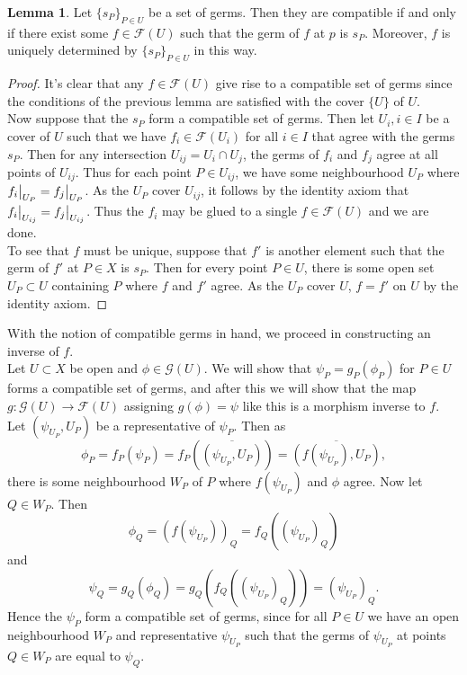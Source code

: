 \documentclass{article}
\newcommand\restr[2]{{%
  \left.\kern-\nulldelimiterspace %
  #1 %
  \vphantom{\big|} %
  \right|_{#2} %
  }}
\theoremstyle{definition}
\newtheorem{lemma}[theorem]{Lemma}
\begin{document}
\begin{lemma}
	Let $\{s_P\}_{P \in U}$ be a set of germs. Then they are compatible if and
	only if there exist some $f \in \mathcal{F}(U)$ such that the germ of $f$
	at $p$ is $s_P$. Moreover, $f$ is uniquely determined by $\{s_P\}_{P \in
	U}$ in this way.
\end{lemma}
\begin{proof}
	It's clear that any $f \in \mathcal{F}(U)$ give rise to a compatible set of
	germs since the conditions of the previous lemma are satisfied with the
	cover $\{U\}$ of $U$. \\

	Now suppose that the $s_P$ form a compatible set of germs. Then let $U_i, i
	\in I$ be a cover of $U$ such that we have $f_i \in \mathcal{F}(U_i)$ for
	all $i \in I$ that agree with the germs $s_P$. Then for any intersection
	$U_{ij} = U_i \cap U_j$, the germs of $f_i$ and $f_j$ agree at all points
	of $U_{ij}$. Thus for each point $P \in U_{ij}$, we have some neighbourhood
	$U_{P}$ where $\restr{f_i}{U_P} = \restr{f_j}{U_P}$. As the $U_P$ cover
	$U_{ij}$, it follows by the identity axiom that $\restr{f_i}{U_{ij}} =
	\restr{f_j}{U_{ij}}$. Thus the $f_i$ may be glued to a single $f \in
	\mathcal{F}(U)$ and we are done. \\

	To see that $f$ must be unique, suppose that $f'$ is another element such
	that the germ of $f'$ at $P \in X$ is $s_P$. Then for every point $P \in
	U$, there is some open set $U_P \subset U$ containing $P$ where $f$ and
	$f'$ agree. As the $U_P$ cover $U$, $f = f'$ on $U$ by the identity axiom.
\end{proof}

With the notion of compatible germs in hand, we proceed in constructing an
inverse of $f$. \\

Let $U \subset X$ be open and $\phi \in \mathcal{G}(U)$. We will show that
$\psi_P = g_P(\phi_P)$ for $P \in U$ forms a compatible set of germs, and after
this we will show that the map $g : \mathcal{G}(U) \to \mathcal{F}(U)$
assigning $g(\phi) = \psi$ like this is a morphism inverse to $f$. \\

Let $(\psi_{U_P}, U_P)$ be a representative of $\psi_P$. Then 
as
\[
	\phi_P 
	= 
	f_P(\psi_P) 
	= 
	f_P(\overline{(\psi_{U_P}, U_P)}) 
	= 
	\overline{(f(\psi_{U_P}), U_P)},
\]
there is some neighbourhood $W_P$ of $P$ where $f(\psi_{U_P})$ and $\phi$
agree. Now let $Q \in W_P$. Then
\[
	\phi_Q 
	= 
	(f(\psi_{U_P}))_Q 
	=
	f_Q((\psi_{U_P})_Q)
\]
and 
\[
	\psi_Q
	=
	g_Q(\phi_Q)
	=
	g_Q(f_Q((\psi_{U_P})_Q))
	=
	(\psi_{U_P})_Q.
\] 
Hence the $\psi_P$ form a compatible set of germs, since for all $P \in U$ we
have an open neighbourhood $W_P$ and representative $\psi_{U_P}$ such that the
germs of $\psi_{U_P}$ at points $Q \in W_P$ are equal to $\psi_Q$. \\
\end{document}
